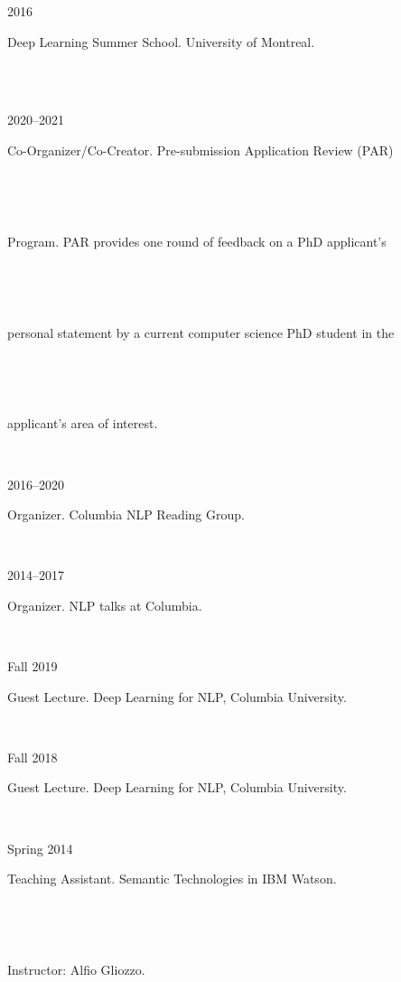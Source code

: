 \documentclass{scrartcl}
\newcommand{\MarginSection}[1]{\marginpar{#1}}
\begin{document}
\begin{cv}{}
{\noindent\parbox{6em}{2016}  Deep Learning Summer School. University of Montreal.} \\ ~\\


\MarginSection{~\\Community\\Service}

{\noindent\parbox{6em}{2020--2021}  Co-Organizer/Co-Creator. Pre-submission Application Review (PAR) }\\
{\noindent\parbox{6em}{~~~~~~~~~~} Program. 
PAR provides one round of feedback on a PhD applicant's}\\
 {\noindent\parbox{6em}{~~~~~~~~~~} personal statement by a current computer science PhD student in the}\\ 
 {\noindent\parbox{6em}{~~~~~~~~~~}
applicant's area of interest. } \\
{\noindent\parbox{6em}{2016--2020}  Organizer. Columbia NLP Reading Group.} \\
{\noindent\parbox{6em}{2014--2017}  Organizer. NLP talks at Columbia.} \\
 

\MarginSection{~\\Teaching\\Experience}
{\noindent\parbox{6em}{Fall 2019}  Guest Lecture. Deep Learning for NLP, Columbia University.}\\
{\noindent\parbox{6em}{Fall 2018}  Guest Lecture. Deep Learning for NLP, Columbia University.}\\
{\noindent\parbox{6em}{Spring 2014}  Teaching Assistant. Semantic Technologies in IBM Watson.}\\
{\noindent\parbox{6em}{~~~~~~~~~~~}  Instructor: Alfio Gliozzo.}


\date{}

\end{cv}
\end{document}
